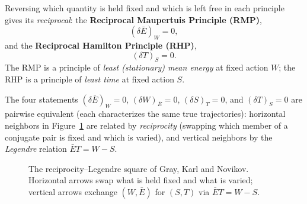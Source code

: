 \begin{definition}
Reversing which quantity is held fixed and which is left free in each principle
    gives its \emph{reciprocal}: the \textbf{Reciprocal Maupertuis Principle
    (RMP)},
\[
(\delta \bar E)_W = 0,
\]
and the \textbf{Reciprocal Hamilton Principle (RHP)},
\[
(\delta T)_S = 0 .
\]
The RMP is a principle of \emph{least (stationary) mean energy} at fixed action
    $W$; the RHP is a principle of \emph{least time} at fixed action $S$.
\end{definition}

\begin{theorem}
The four statements $(\delta \bar E)_W=0$, $(\delta W)_{\bar E}=0$, $(\delta
    S)_T=0$, and $(\delta T)_S=0$ are pairwise equivalent (each characterizes
    the same true trajectories): horizontal neighbors in
    Figure~\ref{square} are related by \emph{reciprocity} (swapping which
    member of a conjugate pair is fixed and which is varied), and vertical
    neighbors by the \emph{Legendre} relation $\bar ET=W-S$.
\end{theorem}

\begin{figure}[h]
\centering
{}
\caption{The reciprocity--Legendre square of Gray, Karl and Novikov. Horizontal arrows swap what is held fixed and what is varied; vertical arrows exchange $(W,\bar E)$ for $(S,T)$ via $\bar ET=W-S$.}
\label{square}
\end{figure}

